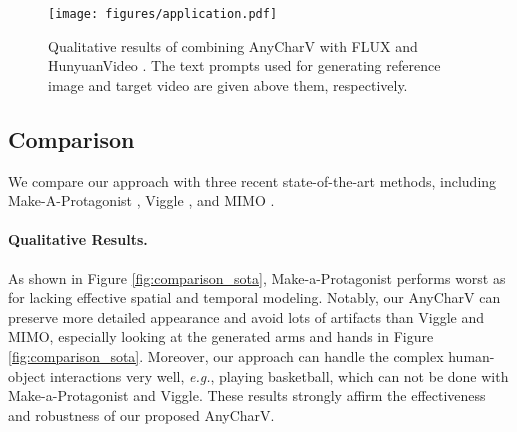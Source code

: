 \begin{figure}[t]
    \centering
    \texttt{[image: figures/application.pdf]}
    \caption{Qualitative results of combining AnyCharV with FLUX \cite{flux2023} and HunyuanVideo \cite{kong2024hunyuanvideo}. The text prompts used for generating reference image and target video are given above them, respectively.}
    \label{fig:application}
\end{figure}







\subsection{Comparison}


We compare our approach with three recent state-of-the-art methods, including Make-A-Protagonist \cite{zhao2023make}, Viggle \cite{viggle2024}, and MIMO \cite{men2024mimo}.



\paragraph{Qualitative Results.}


As shown in Figure \ref{fig:comparison_sota}, Make-a-Protagonist performs worst as for lacking effective spatial and temporal modeling.
Notably, our AnyCharV can preserve more detailed appearance and avoid lots of artifacts than Viggle and MIMO, especially looking at the generated arms and hands in Figure \ref{fig:comparison_sota}.
Moreover, our approach can handle the complex human-object interactions very well, {\it e.g.}, playing basketball, which can not be done with Make-a-Protagonist and Viggle.
These results strongly affirm the effectiveness and robustness of our proposed AnyCharV.





